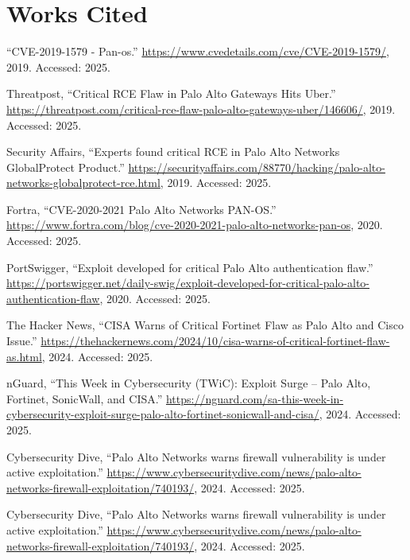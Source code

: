 \documentclass[12pt]{article}
\begin{document}
\section*{Works Cited}
\begin{thebibliography}{10}

``{CVE-2019-1579 - Pan-os}.''
  \url{https://www.cvedetails.com/cve/CVE-2019-1579/}, 2019.
\newblock Accessed: 2025.

{Threatpost}, ``{Critical RCE Flaw in Palo Alto Gateways Hits Uber}.''
  \url{https://threatpost.com/critical-rce-flaw-palo-alto-gateways-uber/146606/},
  2019.
\newblock Accessed: 2025.

{Security Affairs}, ``{Experts found critical RCE in Palo Alto Networks
  GlobalProtect Product}.''
  \url{https://securityaffairs.com/88770/hacking/palo-alto-networks-globalprotect-rce.html},
  2019.
\newblock Accessed: 2025.

{Fortra}, ``{CVE-2020-2021 Palo Alto Networks PAN-OS}.''
  \url{https://www.fortra.com/blog/cve-2020-2021-palo-alto-networks-pan-os},
  2020.
\newblock Accessed: 2025.

{PortSwigger}, ``{Exploit developed for critical Palo Alto authentication
  flaw}.''
  \url{https://portswigger.net/daily-swig/exploit-developed-for-critical-palo-alto-authentication-flaw},
  2020.
\newblock Accessed: 2025.

{The Hacker News}, ``{CISA Warns of Critical Fortinet Flaw as Palo Alto and
  Cisco Issue}.''
  \url{https://thehackernews.com/2024/10/cisa-warns-of-critical-fortinet-flaw-as.html},
  2024.
\newblock Accessed: 2025.

{nGuard}, ``{This Week in Cybersecurity (TWiC): Exploit Surge – Palo Alto,
  Fortinet, SonicWall, and CISA}.''
  \url{https://nguard.com/sa-this-week-in-cybersecurity-exploit-surge-palo-alto-fortinet-sonicwall-and-cisa/},
  2024.
\newblock Accessed: 2025.

{Cybersecurity Dive}, ``{Palo Alto Networks warns firewall vulnerability is
  under active exploitation}.''
  \url{https://www.cybersecuritydive.com/news/palo-alto-networks-firewall-exploitation/740193/},
  2024.
\newblock Accessed: 2025.

{Cybersecurity Dive}, ``{Palo Alto Networks warns firewall vulnerability is
  under active exploitation}.''
  \url{https://www.cybersecuritydive.com/news/palo-alto-networks-firewall-exploitation/740193/},
  2024.
\newblock Accessed: 2025.


\end{thebibliography}
\end{document}
